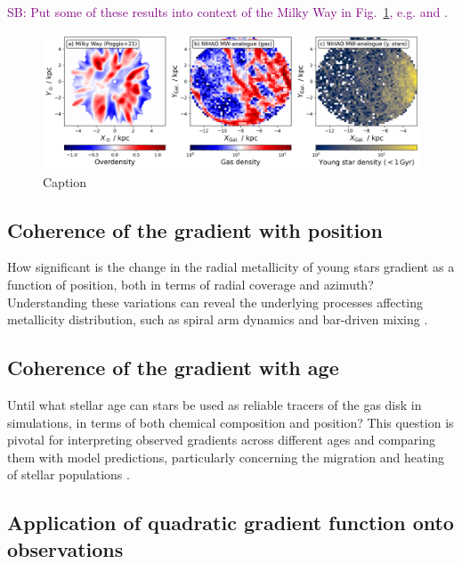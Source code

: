 \documentclass[fleqn,usenatbib]{mnras}
\newcommand{\SB}[1]{{\textcolor{purple}{SB: #1}}}
\begin{document}
\SB{Put some of these results into context of the Milky Way in Fig.~\ref{fig:overdensities_mw_vs_nihao}, e.g. \citet{Poggio2021} and \citet{Hackshaw2024}.}

\begin{figure}
    \centering
    \includegraphics[width=\textwidth]{figures/overdensities_mw_vs_nihao.png}
    \caption{Caption}
    \label{fig:overdensities_mw_vs_nihao}
\end{figure}

\subsection{Coherence of the gradient with position} \label{sec:discussion_coherence_position}

How significant is the change in the radial metallicity of young stars gradient as a function of position, both in terms of radial coverage and azimuth? Understanding these variations can reveal the underlying processes affecting metallicity distribution, such as spiral arm dynamics and bar-driven mixing \citep[see their Figs. 5-8][]{DiMatteo2013}.

\subsection{Coherence of the gradient with age} \label{sec:discussion_coherence_age}

Until what stellar age can stars be used as reliable tracers of the gas disk in simulations, in terms of both chemical composition and position? This question is pivotal for interpreting observed gradients across different ages \citep[e.g.][]{Willett2023} and comparing them with model predictions, particularly concerning the migration and heating of stellar populations \citep{Binney2008, Frankel2018}.

\subsection{Application of quadratic gradient function onto observations}
\end{document}
